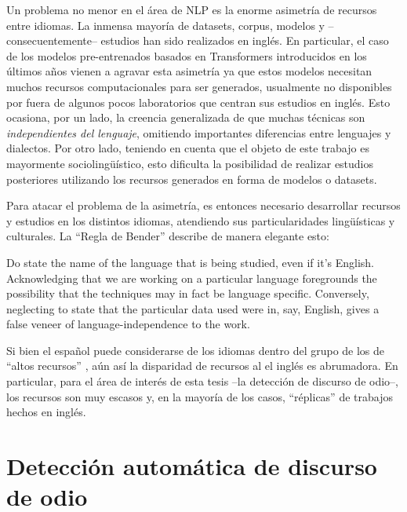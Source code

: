 Un problema no menor en el área de NLP es la enorme asimetría de recursos entre idiomas. La inmensa mayoría de datasets, corpus, modelos y --consecuentemente-- estudios han sido realizados en inglés. En particular, el caso de los modelos pre-entrenados basados en Transformers introducidos en los últimos años vienen a agravar esta asimetría ya que estos modelos necesitan muchos recursos computacionales para ser generados, usualmente no disponibles por fuera de algunos pocos laboratorios que centran sus estudios en inglés. Esto ocasiona, por un lado, la creencia generalizada de que muchas técnicas son \emph{independientes del lenguaje}, omitiendo importantes diferencias entre lenguajes y dialectos. Por otro lado, teniendo en cuenta que el objeto de este trabajo es mayormente sociolingüístico, esto dificulta la posibilidad de realizar estudios posteriores utilizando los recursos generados en forma de modelos o datasets.

Para atacar el problema de la asimetría, es entonces necesario desarrollar recursos y estudios en los distintos idiomas, atendiendo sus particularidades lingüísticas y culturales. La ``Regla de Bender'' describe de manera elegante esto:

\begin{displayquote}
    Do state the name of the language that is being studied, even if it's English. Acknowledging that we are working on a particular language foregrounds the possibility that the techniques may in fact be language specific. Conversely, neglecting to state that the particular data used were in, say, English, gives a false veneer of language-independence to the work.
\end{displayquote}

Si bien el español puede considerarse de los idiomas dentro del grupo de los de ``altos recursos'' \cite{bender2019rule}, aún así la disparidad de recursos al el inglés es abrumadora. En particular, para el área de interés de esta tesis --la detección de discurso de odio--, los recursos son muy escasos y, en la mayoría de los casos, ``réplicas'' de trabajos hechos en inglés.

\section{Detección automática de discurso de odio}

%
%
%
%

